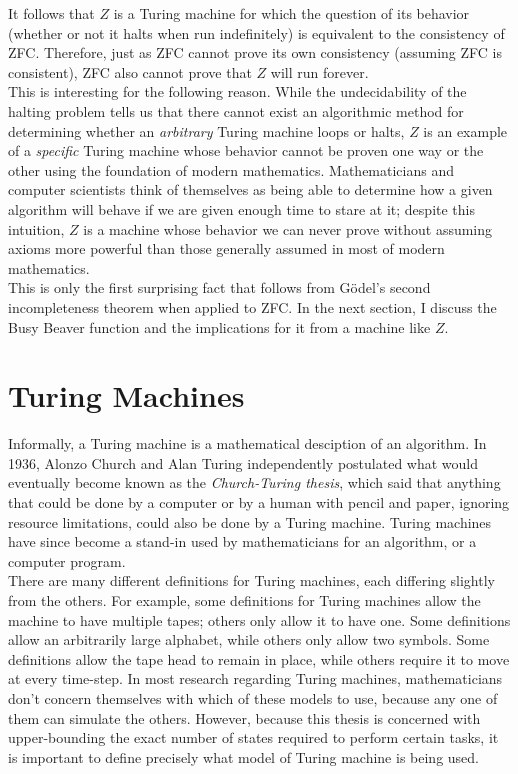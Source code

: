 It follows that $Z$ is a Turing machine for which the question of its behavior (whether or not it halts when run indefinitely) is equivalent to the consistency of ZFC. Therefore, just as ZFC cannot prove its own consistency (assuming ZFC is consistent), ZFC also cannot prove that $Z$ will run forever. \\

This is interesting for the following reason. While the undecidability of the halting problem tells us that there cannot exist an algorithmic method for determining whether an \emph{arbitrary} Turing machine loops or halts, $Z$ is an example of a \emph{specific} Turing machine whose behavior cannot be proven one way or the other using the foundation of modern mathematics. Mathematicians and computer scientists think of themselves as being able to determine how a given algorithm will behave if we are given enough time to stare at it; despite this intuition, $Z$ is a machine whose behavior we can never prove without assuming axioms more powerful than those generally assumed in most of modern mathematics. \\

This is only the first surprising fact that follows from G\"{o}del's second incompleteness theorem when applied to ZFC. In the next section, I discuss the Busy Beaver function and the implications for it from a machine like $Z$.

\section{Turing Machines \label{sec:tm}}

Informally, a Turing machine is a mathematical desciption of an algorithm. In 1936, Alonzo Church and Alan Turing independently postulated what would eventually become known as the \emph{Church-Turing thesis}, which said that anything that could be done by a computer or by a human with pencil and paper, ignoring resource limitations, could also be done by a Turing machine. Turing machines have since become a stand-in used by mathematicians for an algorithm, or a computer program. \\

There are many different definitions for Turing machines, each differing slightly from the others. For example, some definitions for Turing machines allow the machine to have multiple tapes; others only allow it to have one. Some definitions allow an arbitrarily large alphabet, while others only allow two symbols. Some definitions allow the tape head to remain in place, while others require it to move at every time-step. In most research regarding Turing machines, mathematicians don't concern themselves with which of these models to use, because any one of them can simulate the others. However, because this thesis is concerned with upper-bounding the exact number of states required to perform certain tasks, it is important to define precisely what model of Turing machine is being used. \\

